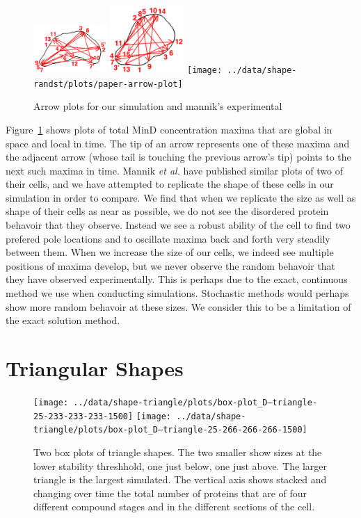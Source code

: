 \documentclass[letterpaper,twocolumn,amsmath,amssymb,pre]{revtex4-1}
\begin{document}
\begin{figure}
  \includegraphics[width=2.8cm]{../mannik-2.png}
  \includegraphics[width=2.8cm]{../mannik-1.png}
  \texttt{[image: ../data/shape-randst/plots/paper-arrow-plot]}
  \caption{Arrow plots for our simulation and mannik's experimental}
  \label{arrow-compare-mannik}
\end{figure}

Figure~\ref{arrow-compare-mannik} shows plots of total MinD
concentration maxima that are global in space and local in time.  The
tip of an arrow represents one of these maxima and the adjacent arrow
(whose tail is touching the previous arrow's tip) points to the next
such maxima in time.  Mannik \emph{et al.} have published similar
plots of two of their cells, and we have attempted to replicate the
shape of these cells in our simulation in order to compare.  We find
that when we replicate the size as well as shape of their cells as
near as possible, we do not see the disordered protein behavoir that
they observe.  Instead we see a robust ability of the cell to find two
prefered pole locations and to oscillate maxima back and forth very
steadily between them.  When we increase the size of our cells, we
indeed see multiple positions of maxima develop, but we never observe
the random behavoir that they have observed experimentally.  This is
perhaps due to the exact, continuous method we use when conducting
simulations.  Stochastic methods would perhaps show more random
behavoir at these sizes.  We consider this to be a limitation of the
exact solution method.

\section{Triangular Shapes}

\begin{figure}
  \texttt{[image: ../data/shape-triangle/plots/box-plot\_D--triangle-25-233-233-233-1500]}
  \texttt{[image: ../data/shape-triangle/plots/box-plot\_D--triangle-25-266-266-266-1500]}
  \caption{Two box plots of triangle shapes.  The two smaller show
    sizes at the lower stability threshhold, one just below, one just
    above.  The larger triangle is the largest simulated. The vertical
    axis shows stacked and changing over time the total number of
    proteins that are of four different compound stages and in the
    different sections of the cell.}
  \label{box-triangle}
\end{figure}
\end{document}
